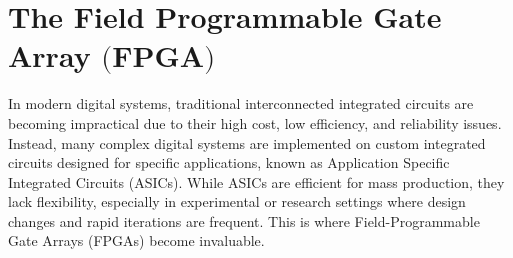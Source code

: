 








\section[The Field Programmable Gate Array]{The Field Programmable Gate Array $\bigl($FPGA$\bigr)$}\label{sec:FPGA}

In modern digital systems, traditional interconnected integrated circuits are becoming impractical due to their high cost, low efficiency, and reliability issues. Instead, many complex digital systems are implemented on custom integrated circuits designed for specific applications, known as Application Specific Integrated Circuits (ASICs). While ASICs are efficient for mass production, they lack flexibility, especially in experimental or research settings where design changes and rapid iterations are frequent. This is where Field-Programmable Gate Arrays (FPGAs) become invaluable.

